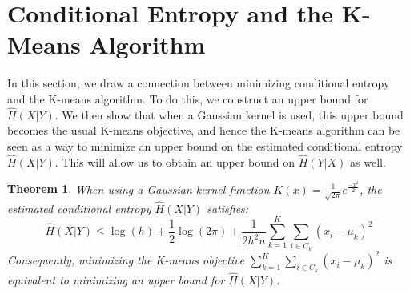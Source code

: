 \documentclass{article} %
\newtheorem{theorem}{Theorem}
\begin{document}
\section{Conditional Entropy and the K-Means Algorithm}
In this section, we draw a connection between minimizing conditional entropy and the K-means algorithm. To do this, we construct an upper bound for $\hat{H}(X|Y)$. We then show that when a Gaussian kernel is used, this upper bound becomes the usual K-means objective, and hence the K-means algorithm can be seen as a way to minimize an upper bound on the estimated conditional entropy $\hat{H}(X|Y)$. This will allow us to obtain an upper bound on $\hat{H}(Y|X)$ as well.
\begin{theorem}
\label{eq:hxy}
When using a Gaussian kernel function $K(x) = \frac{1}{\sqrt{2\pi}} e^{\frac{-x^2}{2}}$, the estimated conditional entropy $\hat{H}(X|Y)$ satisfies:
\[ \hat{H}(X|Y) \le \log(h) + \frac{1}{2}\log(2 \pi) + \frac{1}{2h^2 n} \sum_{k=1}^K \sum_{i \in C_k} (x_i - \mu_k)^2 \]
Consequently, minimizing the K-means objective $\sum_{k=1}^K \sum_{i \in C_k} (x_i - \mu_k)^2$ is equivalent to minimizing an upper bound for $\hat{H}(X|Y)$.
\end{theorem}
\end{document}
